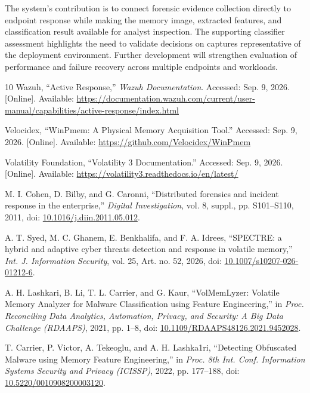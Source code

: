 \documentclass[conference]{IEEEtran}
\begin{document}
The system's contribution is to connect forensic evidence collection directly to endpoint response while making the memory image, extracted features, and classification result available for analyst inspection. The supporting
classifier assessment highlights the need to validate decisions on captures representative of the deployment environment. Further development will strengthen evaluation of performance and failure recovery across multiple endpoints and workloads.
\begin{thebibliography}{10}
 Wazuh, ``Active Response,'' \textit{Wazuh Documentation}.
Accessed: Sep. 9, 2026. [Online]. Available:
\url{https://documentation.wazuh.com/current/user-manual/capabilities/active-response/index.html}

 Velocidex, ``WinPmem: A Physical Memory Acquisition Tool.''
Accessed: Sep. 9, 2026. [Online]. Available:
\url{https://github.com/Velocidex/WinPmem}

 Volatility Foundation, ``Volatility 3 Documentation.''
Accessed: Sep. 9, 2026. [Online]. Available:
\url{https://volatility3.readthedocs.io/en/latest/}

 M. I. Cohen, D. Bilby, and G. Caronni,
``Distributed forensics and incident response in the enterprise,''
\textit{Digital Investigation}, vol. 8, suppl., pp. S101--S110, 2011,
doi: \href{https://doi.org/10.1016/j.diin.2011.05.012}{10.1016/j.diin.2011.05.012}.

 A. T. Syed, M. C. Ghanem, E. Benkhalifa, and
F. A. Idrees, ``SPECTRE: a hybrid and adaptive cyber threats detection and
response in volatile memory,'' \textit{Int. J. Information Security},
vol. 25, Art. no. 52, 2026,
doi: \href{https://doi.org/10.1007/s10207-026-01212-6}{10.1007/s10207-026-01212-6}.

 A. H. Lashkari, B. Li, T. L. Carrier, and G. Kaur,
``VolMemLyzer: Volatile Memory Analyzer for Malware Classification using
Feature Engineering,'' in \textit{Proc. Reconciling Data Analytics,
Automation, Privacy, and Security: A Big Data Challenge (RDAAPS)},
2021, pp. 1--8,
doi: \href{https://doi.org/10.1109/RDAAPS48126.2021.9452028}{10.1109/RDAAPS48126.2021.9452028}.

 T. Carrier, P. Victor, A. Tekeoglu, and A. H. Lashka1ri,
``Detecting Obfuscated Malware using Memory Feature Engineering,'' in
\textit{Proc. 8th Int. Conf. Information Systems Security and Privacy
(ICISSP)}, 2022, pp. 177--188,
doi: \href{https://doi.org/10.5220/0010908200003120}{10.5220/0010908200003120}.


\end{thebibliography}
\end{document}
